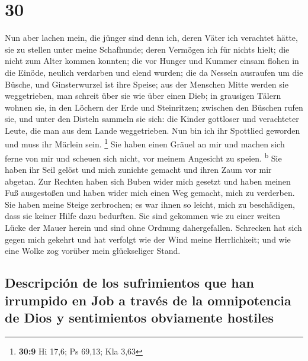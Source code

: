 \hypertarget{section-29}{%
\section{30}\label{section-29}}

 Nun aber lachen mein, die jünger sind denn ich, deren
Väter ich verachtet hätte, sie zu stellen unter meine Schafhunde;
 deren Vermögen ich für nichts hielt; die nicht zum Alter
kommen konnten;  die vor Hunger und Kummer einsam flohen
in die Einöde, neulich verdarben und elend wurden;  die da
Nesseln ausraufen um die Büsche, und Ginsterwurzel ist ihre Speise;
 aus der Menschen Mitte werden sie weggetrieben, man
schreit über sie wie über einen Dieb;  in grausigen Tälern
wohnen sie, in den Löchern der Erde und Steinritzen; 
zwischen den Büschen rufen sie, und unter den Disteln sammeln sie sich:
 die Kinder gottloser und verachteter Leute, die man aus
dem Lande weggetrieben.  Nun bin ich ihr Spottlied
geworden und muss ihr Märlein sein. \footnote{\textbf{30:9} Hi 17,6; Ps
  69,13; Kla 3,63}  Sie haben einen Gräuel an mir und
machen sich ferne von mir und scheuen sich nicht, vor meinem Angesicht
zu speien. \textsuperscript{b}  Sie haben ihr Seil gelöst
und mich zunichte gemacht und ihren Zaum vor mir abgetan.
 Zur Rechten haben sich Buben wider mich gesetzt und
haben meinen Fuß ausgestoßen und haben wider mich einen Weg gemacht,
mich zu verderben.  Sie haben meine Steige zerbrochen; es
war ihnen so leicht, mich zu beschädigen, dass sie keiner Hilfe dazu
bedurften.  Sie sind gekommen wie zu einer weiten Lücke
der Mauer herein und sind ohne Ordnung dahergefallen. 
Schrecken hat sich gegen mich gekehrt und hat verfolgt wie der Wind
meine Herrlichkeit; und wie eine Wolke zog vorüber mein glückseliger
Stand.

\hypertarget{descripciuxf3n-de-los-sufrimientos-que-han-irrumpido-en-job-a-travuxe9s-de-la-omnipotencia-de-dios-y-sentimientos-obviamente-hostiles}{%
\subsection{Descripción de los sufrimientos que han irrumpido en Job a
través de la omnipotencia de Dios y sentimientos obviamente
hostiles}\label{descripciuxf3n-de-los-sufrimientos-que-han-irrumpido-en-job-a-travuxe9s-de-la-omnipotencia-de-dios-y-sentimientos-obviamente-hostiles}}

